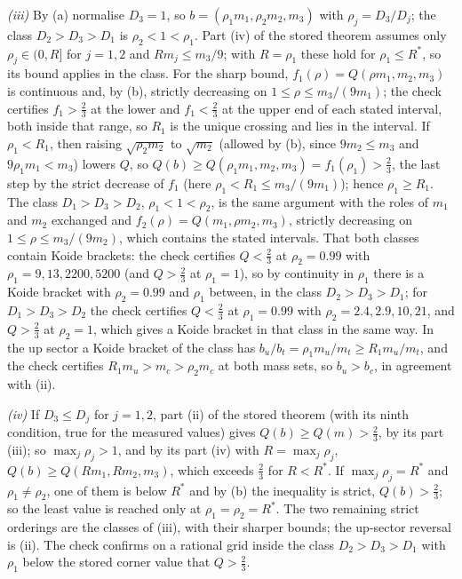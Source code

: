 \emph{(iii)} By (a) normalise $D_{3} = 1$, so $b = (\rho_{1}m_{1}, \rho_{2}m_{2}, m_{3})$ with $\rho_{j} = D_{3}/D_{j}$; the class $D_{2} > D_{3} > D_{1}$ is $\rho_{2} < 1 < \rho_{1}$. Part (iv) of the stored theorem assumes only $\rho_{j} \in (0, R]$ for $j = 1, 2$ and $Rm_{j} \le m_{3}/9$; with $R = \rho_{1}$ these hold for $\rho_{1} \le R^{*}$, so its bound applies in the class. For the sharp bound, $f_{1}(\rho) = Q(\rho m_{1}, m_{2}, m_{3})$ is continuous and, by (b), strictly decreasing on $1 \le \rho \le m_{3}/(9m_{1})$; the check certifies $f_{1} > \tfrac23$ at the lower and $f_{1} < \tfrac23$ at the upper end of each stated interval, both inside that range, so $R_{1}$ is the unique crossing and lies in the interval. If $\rho_{1} < R_{1}$, then raising $\sqrt{\rho_{2}m_{2}}$ to $\sqrt{m_{2}}$ (allowed by (b), since $9m_{2} \le m_{3}$ and $9\rho_{1}m_{1} < m_{3}$) lowers $Q$, so $Q(b) \ge Q(\rho_{1}m_{1}, m_{2}, m_{3}) = f_{1}(\rho_{1}) > \tfrac23$, the last step by the strict decrease of $f_{1}$ (here $\rho_{1} < R_{1} \le m_{3}/(9m_{1})$); hence $\rho_{1} \ge R_{1}$. The class $D_{1} > D_{3} > D_{2}$, $\rho_{1} < 1 < \rho_{2}$, is the same argument with the roles of $m_{1}$ and $m_{2}$ exchanged and $f_{2}(\rho) = Q(m_{1}, \rho m_{2}, m_{3})$, strictly decreasing on $1 \le \rho \le m_{3}/(9m_{2})$, which contains the stated intervals. That both classes contain Koide brackets: the check certifies $Q < \tfrac23$ at $\rho_{2} = 0.99$ with $\rho_{1} = 9, 13, 2200, 5200$ (and $Q > \tfrac23$ at $\rho_{1} = 1$), so by continuity in $\rho_{1}$ there is a Koide bracket with $\rho_{2} = 0.99$ and $\rho_{1}$ between, in the class $D_{2} > D_{3} > D_{1}$; for $D_{1} > D_{3} > D_{2}$ the check certifies $Q < \tfrac23$ at $\rho_{1} = 0.99$ with $\rho_{2} = 2.4, 2.9, 10, 21$, and $Q > \tfrac23$ at $\rho_{2} = 1$, which gives a Koide bracket in that class in the same way. In the up sector a Koide bracket of the class has $b_{u}/b_{t} = \rho_{1}m_{u}/m_{t} \ge R_{1}m_{u}/m_{t}$, and the check certifies $R_{1}m_{u} > m_{c} > \rho_{2}m_{c}$ at both mass sets, so $b_{u} > b_{c}$, in agreement with (ii).

\emph{(iv)} If $D_{3} \le D_{j}$ for $j = 1, 2$, part (ii) of the stored theorem (with its ninth condition, true for the measured values) gives $Q(b) \ge Q(m) > \tfrac23$, by its part (iii); so $\max_{j}\rho_{j} > 1$, and by its part (iv) with $R = \max_{j}\rho_{j}$, $Q(b) \ge Q(Rm_{1}, Rm_{2}, m_{3})$, which exceeds $\tfrac23$ for $R < R^{*}$. If $\max_{j}\rho_{j} = R^{*}$ and $\rho_{1} \ne \rho_{2}$, one of them is below $R^{*}$ and by (b) the inequality is strict, $Q(b) > \tfrac23$; so the least value is reached only at $\rho_{1} = \rho_{2} = R^{*}$. The two remaining strict orderings are the classes of (iii), with their sharper bounds; the up-sector reversal is (ii). The check confirms on a rational grid inside the class $D_{2} > D_{3} > D_{1}$ with $\rho_{1}$ below the stored corner value that $Q > \tfrac23$.
